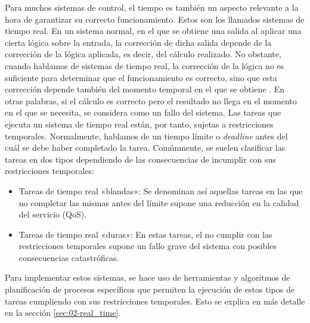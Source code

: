 Para muchos sistemas de control, el tiempo es también un aspecto relevante a la
hora de garantizar su correcto funcionamiento. Estos son los llamados sistemas
de tiempo real. En un sistema normal, en el que se obtiene una salida al aplicar
una cierta lógica sobre la entrada, la corrección de dicha salida depende de la
corrección de la lógica aplicada, es decir, del cálculo realizado. No obstante,
cuando hablamos de sistemas de tiempo real, la corrección de la lógica no es
suficiente para determinar que el funcionamiento es correcto, sino que esta
corrección depende también del momento temporal en el que se obtiene
\cite{gambier_real-time_2004}. En otras palabras, si el cálculo es correcto pero
el resultado no llega en el momento en el que se necesita, se considera como un
fallo del sistema. Las tareas que ejecuta un sistema de tiempo real están, por
tanto, sujetas a restricciones temporales. Normalmente, hablamos de un tiempo
límite o \textit{deadline} antes del cuál se debe haber completado la tarea.
Comúnmente, se suelen clasificar las tareas en dos tipos dependiendo de las
consecuencias de incumplir con sus restricciones temporales:

\begin{itemize}
  \item Tareas de tiempo real «blandas»: Se denominan así aquellas tareas en las
        que no completar las mismas antes del límite supone una reducción en la
        calidad del servicio (QoS).
  \item Tareas de tiempo real «duras»: En estas tareas, el no cumplir con las
        restricciones temporales supone un fallo grave del sistema con posibles
        consecuencias catastróficas.
\end{itemize}

Para implementar estos sistemas, se hace uso de herramientas y algoritmos de
planificación de procesos específicos que permiten la ejecución de estos tipos
de tareas cumpliendo con sus restricciones temporales. Esto se explica en más
detalle en la sección \ref{sec:02-real_time}.

